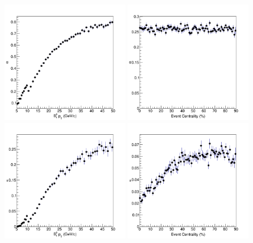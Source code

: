 \begin{figure}[h]
\begin{center}
\includegraphics[width=0.48\textwidth]{Figures/Chapter4/BPAcc1DPtHis.png}
\includegraphics[width=0.48\textwidth]{Figures/Chapter4/BPAcc1DCentHis.png}
\includegraphics[width=0.48\textwidth]{Figures/Chapter4/BPSel1DPtHis.png}
\includegraphics[width=0.48\textwidth]{Figures/Chapter4/BPSel1DCentHis.png}

\end{center}
\end{figure}

